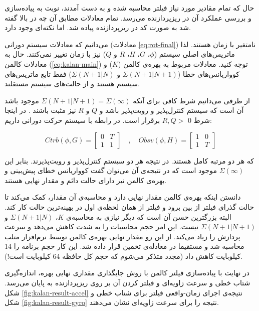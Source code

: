 حال که تمام مقادیر مورد نیاز فیلتر محاسبه شده و به دست آمدند، نوبت به پیاده‌سازی و بررسی عملکرد آن در ریزپردازنده می‌رسد. تمام معادلات مطابق آن چه در بالا گفته شد به صورت کد  در ریزپردازنده پیاده شد. اما نکته‌ای وجود دارد.

می‌دانیم که معادلات سیستم دورانی (معادلات \ref{eq:rot-final}) نامتغیر با زمان هستند. لذا ماتریس‌های اصلی سیستم ($\phi$، $G$، $H$، $R$ و $Q$) نیز با زمان تغییر نمی‌کنند. حال به معادلات کالمن (\ref{eq:kalan-main}) توجه کنید. معادلات مربوط به بهره‌ی کالمن ($K$) و کوواریانس‌های خطا ($\Sigma(N+1|N+1)$ و $\Sigma(N+1|N)$) فقط تابع ماتریس‌های سیستم هستند و از حالت‌های سیستم مستقلند.

از طرفی می‌دانیم شرط کافی برای آنکه $\Sigma(N+1|N+1) = \Sigma(\infty)$ موجود باشد آن است که سیستم کنترل‌پذیر و رویت‌پذیر باشد و $Q$ و $R$ نیز مثبت باشند \cite{uncertain}. در اینجا شرط 0 $R,Q > $ برقرار است. در رابطه با سیستم حرکت دورانی داریم:

\begin{equation*}
	Ctrb(\phi, G) =
	\begin{bmatrix}
		0 & T \\
		1 & 1
	\end{bmatrix} \quad , \quad
	Obsv(\phi, H) =
	\begin{bmatrix}
		1 & 0 \\
		1 & T
	\end{bmatrix}
\end{equation*}

که هر دو مرتبه کامل هستند. در نتیجه هر دو سیستم کنترل‌پذیر و رویت‌پذیرند. بنابر این $\Sigma(\infty)$ موجود است که در نتیجه‌ی آن می‌توان گفت کوواریانس خطای پیش‌بینی و بهره‌ی کالمن نیز دارای حالت دائم و مقدار نهایی هستند.

دانستن اینکه بهره‌ی کالمن مقدار نهایی دارد و محاسبه‌ی آن مقدار، کمک می‌کند تا حالت گذرای فیلتر از بین برود و فیلتر از همان لحظه‌ی اول در بهینه‌ترین حالت کار کند. البته بزرگترین حسن آن است که دیگر نیازی به محاسبه‌ی $K$، $\Sigma(N+1|N)$ و $\Sigma(N+1|N+1)$ نیست. این امر حجم محاسبات را به شدت کاهش می‌دهد و سرعت پردازش را زیاد می‌کند. از این رو مقدار نهایی بهره‌ی کالمن توسط نرم‌افزار متلب محاسبه شد و مستقیما در معادله‌ی تخمین قرار داده شد. این کار حجم برنامه را 14 کیلوبایت کاهش داد (مجدد متذکر می‌شوم که حجم کل حافظه 64 کیلوبایت است!).


در نهایت با پیاده‌سازی فیلتر کالمن با روش جایگذاری مقداری نهایی بهره، اندازه‌گیری شتاب خطی و سرعت زاویه‌ای و فیلتر کردن آن بر روی ریزپردازنده به پایان می‌رسد. شکل \ref{fig:kalan-result-accel} نتیجه‌ی اجرای زمان-واقعی فیلتر برای شتاب خطی و شکل \ref{fig:kalan-result-gyro} نتیجه را برای سرعت زاویه‌ای نشان می‌دهند.

